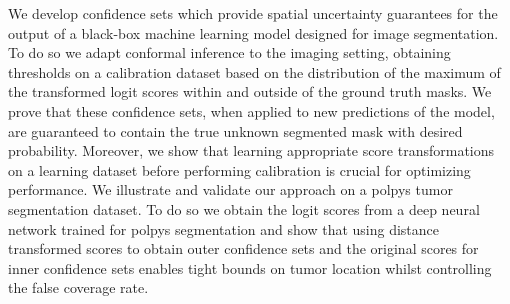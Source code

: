 We develop confidence sets which provide spatial uncertainty guarantees for the output of a black-box machine learning model designed for image segmentation. To do so we adapt conformal inference to the imaging setting, obtaining thresholds on a calibration dataset based on the distribution of the maximum of the transformed logit scores within and outside of the ground truth masks. We prove that these confidence sets, when applied to new predictions of the model, are guaranteed to contain the true unknown segmented mask with desired probability. Moreover, we show that learning appropriate score transformations on a learning dataset before performing calibration is crucial for optimizing performance. We illustrate and validate our approach on a polpys tumor segmentation dataset. To do so we obtain the logit scores from a deep neural network trained for polpys segmentation and show that using distance transformed scores to obtain outer confidence sets and the original scores for inner confidence sets enables tight bounds on tumor location whilst controlling the false coverage rate. 